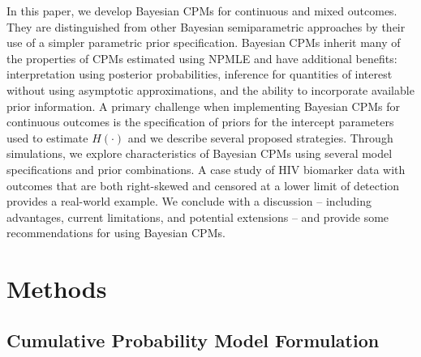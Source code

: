 \documentclass[
]{article}
\begin{document}
In this paper, we develop Bayesian CPMs for continuous and mixed outcomes.
They are distinguished from other Bayesian semiparametric approaches by their use of a simpler parametric prior specification. Bayesian CPMs inherit many of the properties of CPMs estimated using NPMLE and have additional benefits: interpretation using posterior probabilities, inference for quantities of interest without using asymptotic approximations, and the ability to incorporate available prior information.
A primary challenge when implementing Bayesian CPMs for continuous outcomes is the specification of priors for the intercept parameters used to estimate \(H(\cdot)\) and we describe several proposed strategies. Through simulations, we explore characteristics of Bayesian CPMs using several model specifications and prior combinations. A case study of HIV biomarker data with outcomes that are both right-skewed and censored at a lower limit of detection provides a real-world example. We conclude with a discussion -- including advantages, current limitations, and potential extensions -- and provide some recommendations for using Bayesian CPMs.

\hypertarget{methods}{%
\section{Methods}\label{methods}}

\hypertarget{cumulative-probability-model-formulation}{%
\subsection{Cumulative Probability Model Formulation}\label{cumulative-probability-model-formulation}}
\end{document}
